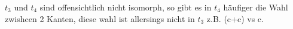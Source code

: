 $t_3$ und $t_4$ sind offensichtlich nicht isomorph, so gibt es in $t_4$ häufiger die Wahl zwishcen 2 Kanten, diese wahl ist allersings nicht in $t_3$ z.B. (c+c) vs c.